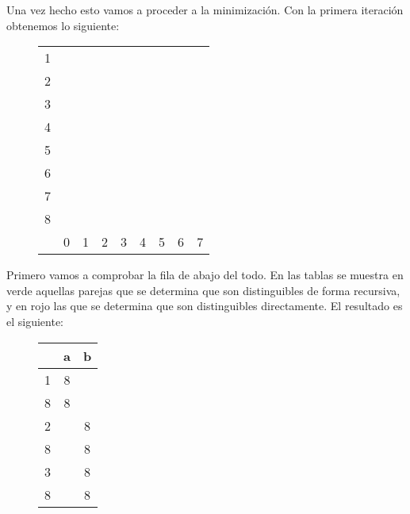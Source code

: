 \documentclass[11pt,a4paper]{article}
\begin{document}
		Una vez hecho esto vamos a proceder a la minimización. Con la primera iteración obtenemos lo siguiente:
		
		\begin{figure}[H]
			\centering
			\begin{tabular}{*{9}{c|}}
																							\cline{2-2}
				1 & \color{blue}{X}															\\ \cline{2-3}
				2 & \color{blue}{X} &														\\ \cline{2-4}
				3 & \color{blue}{X} & &											\\ \cline{2-5}
				4 & & \color{blue}{X} & \color{blue}{X} & \color{blue}{X}	\\ \cline{2-6}
				5 & & \color{blue}{X} & \color{blue}{X} & \color{blue}{X} & \\ \cline{2-7}
				6 & & \color{blue}{X} & \color{blue}{X} & \color{blue}{X} & & \\ \cline{2-8}
				7 & & \color{blue}{X} & \color{blue}{X} & \color{blue}{X} & & & \\ \cline{2-9}
				8 & \color{blue}{X} & & & & \color{blue}{X} & \color{blue}{X} &
					\color{blue}{X} & \color{blue}{X} \\ \cline{2-9}
				\multicolumn{0}{c}{} & \multicolumn{1}{c}{0} & \multicolumn{1}{c}{1} & \multicolumn{1}{c}{2}
				& \multicolumn{1}{c}{3} & \multicolumn{1}{c}{4} & \multicolumn{1}{c}{5} & \multicolumn{1}{c}{6}
				& \multicolumn{1}{c}{7}
			\end{tabular}
		\end{figure}
		
		Primero vamos a comprobar la fila de abajo del todo. En las tablas se muestra en verde aquellas parejas que se
		determina que son distinguibles de forma recursiva, y en rojo las que se determina que son distinguibles
		directamente. El resultado es el siguiente:
		
		\begin{figure}[H]
			\centering
			\begin{tabular}{c|cc}
				& a & b		\\ \hline
				1 & 8 & \color{green}{2}	\\
				8 & 8 & \color{green}{8}	\\ \hline
				2 & \color{red}{0} & 8	\\
				8 & \color{red}{8} & 8	\\ \hline
				3 & \color{red}{4} & 8	\\
				8 & \color{red}{8} & 8	\\ \hline				
			\end{tabular}
		\end{figure}
		
\end{document}
